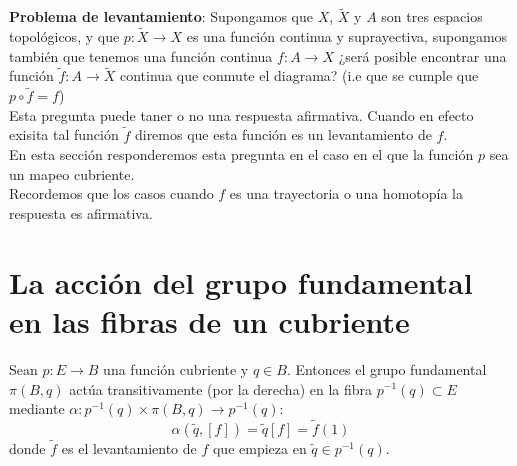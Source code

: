 \textbf{Problema de levantamiento}: Supongamos que $X$, $\widetilde{X}$ y $A$ son tres espacios topol\'ogicos, y que $p: \widetilde{X} \rightarrow X$ es una funci\'on continua y suprayectiva, supongamos tambi\'en que tenemos una funci\'on continua $f: A \rightarrow X$ ¿ser\'a posible encontrar una funci\'on $\widetilde{f} : A  \rightarrow \widetilde{X}$ continua que conmute el diagrama? (i.e que se cumple que $p \circ \widetilde{f}= f$)\\
Esta pregunta puede taner o no una respuesta afirmativa. Cuando en efecto exisita tal funci\'on $\widetilde{f}$ diremos que esta funci\'on es un levantamiento de $f$.\\
En esta secci\'on responderemos esta pregunta en el caso en el que la funci\'on $p$ sea un mapeo cubriente.\\
Recordemos que los casos cuando $f$ es una trayectoria o una homotop\'ia la respuesta es afirmativa.\\ 

































\section{La acci\'on del grupo fundamental en las fibras de un cubriente}

\begin{theorem}
 Sean $p:E \to B$ una funci\'on cubriente y $q \in B$. Entonces el grupo fundamental $\pi(B,q)$ act\'ua transitivamente (por la derecha)
 en la fibra $p^{-1}(q) \subset E$ mediante $\alpha: p^{-1}(q) \times \pi(B,q) \to p^{-1}(q)$:
 \begin{equation} \label{AccGpoFund:ec}
  \alpha(\widetilde{q},[f]) = \widetilde{q}[f] = \widetilde{f}(1)  
 \end{equation}
 donde $\widetilde{f}$ es el levantamiento de $f$ que empieza en $\widetilde{q} \in p^{-1}(q)$.
\end{theorem}


